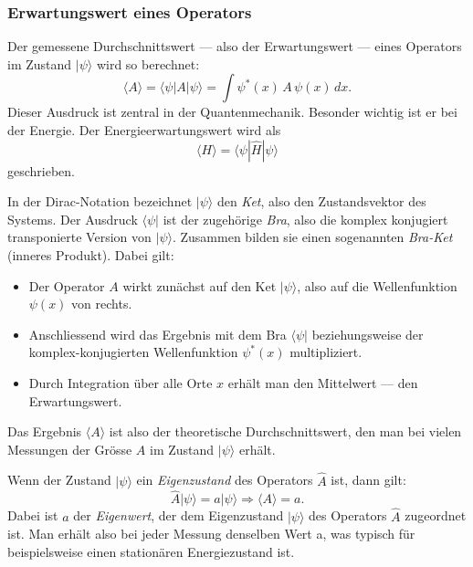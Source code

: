 	\subsubsection{Erwartungswert eines Operators\label{fourier:subsubsection:erwartungswertEinesOperators}}
		Der gemessene Durchschnittswert --- also der Erwartungswert --- eines Operators im Zustand $|\psi\rangle$ wird so berechnet:
		\begin{equation}
			\langle A \rangle = \langle \psi | A | \psi \rangle = \int \psi^*(x)\,A\,\psi(x)\,dx.
		\end{equation}
		Dieser Ausdruck ist zentral in der Quantenmechanik.
		Besonder wichtig ist er bei der Energie. Der Energieerwartungswert wird als
		\begin{equation}
			\langle H \rangle = \langle \psi|\hat{H}|\psi \rangle
		\end{equation}
		geschrieben.

		In der Dirac-Notation bezeichnet $|\psi\rangle$ den \emph{Ket}, also den Zustandsvektor des Systems.
		Der Ausdruck $\langle \psi |$ ist der zugehörige \emph{Bra}, also die komplex konjugiert transponierte Version von $|\psi\rangle$.
		Zusammen bilden sie einen sogenannten \emph{Bra-Ket} (inneres Produkt).
		Dabei gilt:
		\begin{itemize}
			\item Der Operator $A$ wirkt zunächst auf den Ket $|\psi\rangle$, also auf die Wellenfunktion $\psi(x)$ von rechts.
			\item Anschliessend wird das Ergebnis mit dem Bra $\langle \psi|$ beziehungsweise der komplex-konjugierten Wellenfunktion $\psi^*(x)$ multipliziert.
			\item Durch Integration über alle Orte $x$ erhält man den Mittelwert --- den Erwartungswert.
		\end{itemize}
		Das Ergebnis $\langle A \rangle$ ist also der theoretische Durchschnittswert, den man bei vielen Messungen der Grösse $A$ im Zustand $|\psi\rangle$ erhält.

		Wenn der Zustand $|\psi\rangle$ ein \emph{Eigenzustand} des Operators $\hat{A}$ ist, dann gilt:
		\begin{equation}
			\hat{A} | \psi \rangle = a | \psi \rangle \Rightarrow \langle A \rangle = a.
		\end{equation}
		Dabei ist $a$ der \emph{Eigenwert}, der dem Eigenzustand $|\psi\rangle$ des Operators $\hat{A}$ zugeordnet ist. 
		Man erhält also bei jeder Messung denselben Wert a, was typisch für beispielsweise einen stationären Energiezustand ist.

